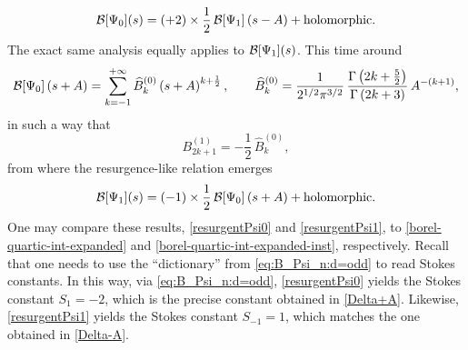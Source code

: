 \documentclass[11pt,a4paper]{article}
\newcommand{\CB}{{\cal B}}
\newcommand{\be}{\begin{equation}}
\newcommand{\ee}{\end{equation}}
\begin{document}
%
\be
\label{resurgentPsi0}
\CB[\Psi_0](s) = \left( + 2 \right) \times \frac{1}{2}\, \CB[\Psi_1] \left(s-A\right) + \text{holomorphic}.
\ee
%
\noindent
The exact same analysis equally applies to $\CB[\Psi_1](s)$. This time around
%
\be
\CB[\Psi_0] \left(s+A\right) = \sum_{k=-1}^{+\infty} \widehat{B}_k^{(0)} \left( s + A \right)^{k+\frac{1}{2}}, \qquad \widehat{B}_k^{(0)} = \frac{1}{2^{1/2}\pi^{3/2}}\, \frac{\Gamma \left( 2k+\frac{5}{2} \right)}{\Gamma \left( 2k+3 \right)}\, A^{- \left( k+1 \right)},
\ee
%
\noindent
in such a way that
%
\be
B_{2k+1}^{(1)} = - \frac{1}{2}\, \widehat{B}_k^{(0)},
\ee
%
\noindent
from where the resurgence-like relation emerges
%
\be
\label{resurgentPsi1}
\CB[\Psi_1](s) = \left( - 1 \right) \times \frac{1}{2}\, \CB[\Psi_0] \left(s+A\right) + \text{holomorphic}.
\ee 
%
\noindent
One may compare these results, \eqref{resurgentPsi0} and \eqref{resurgentPsi1}, to \eqref{borel-quartic-int-expanded} and \eqref{borel-quartic-int-expanded-inst}, respectively. Recall that one needs to use the ``dictionary'' from \eqref{eq:B_Psi_n:d=odd} to read Stokes constants. In this way, via \eqref{eq:B_Psi_n:d=odd}, \eqref{resurgentPsi0} yields the Stokes constant $S_1 = - 2$, which is the precise constant obtained in \eqref{Delta+A}. Likewise, \eqref{resurgentPsi1} yields the Stokes constant $S_{-1} = 1$, which matches the one obtained in \eqref{Delta-A}.
\end{document}

